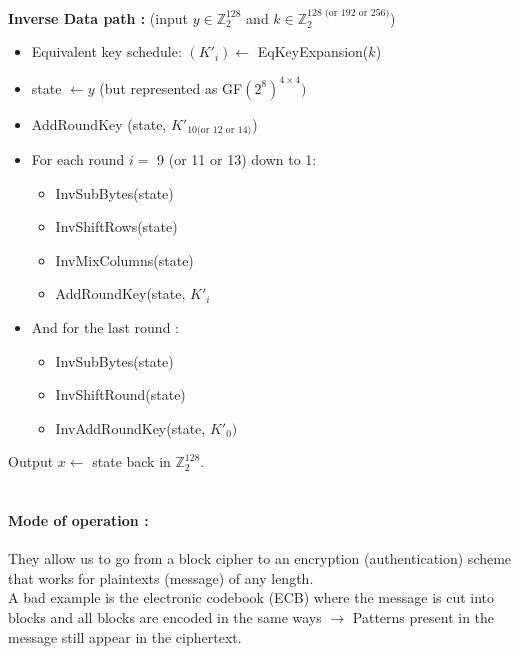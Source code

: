 \documentclass[11pt,a4paper]{report}
\begin{document}
\textbf{Inverse Data path :} (input $y \in \mathbb{Z}_2^{128}$ and $k \in \mathbb{Z}_2^{128 \text{ (or 192 or 256)}}$)
\begin{itemize}
\item Equivalent key schedule: $(K'_i) \leftarrow $ EqKeyExpansion($k$)
\item state $\leftarrow y$ (but represented as GF$(2^8)^{4\times 4})$
\item AddRoundKey (state, $K'_{10 \text{(or 12 or 14)}}$)
\item For each round $i = $ 9 (or 11 or 13) down to 1:
\begin{itemize}
\item InvSubBytes(state)
\item InvShiftRows(state)
\item InvMixColumns(state)
\item AddRoundKey(state, $K'_i$
\end{itemize}
\item And for the last round :
\begin{itemize}
\item InvSubBytes(state)
\item InvShiftRound(state)
\item InvAddRoundKey(state, $K'_{0})$
\end{itemize}
\end{itemize}
Output $x \leftarrow$ state back in $\mathbb{Z}_2^{128}$.\\
\\
\paragraph{Mode of operation :} They allow us to go from a block cipher to an encryption (authentication) scheme that works for plaintexts (message) of any length.\\

A bad example is the electronic codebook (ECB) where the message is cut into blocks and all blocks are encoded in the same ways $\rightarrow$ Patterns present in the message still appear in the ciphertext.\\
\end{document}
